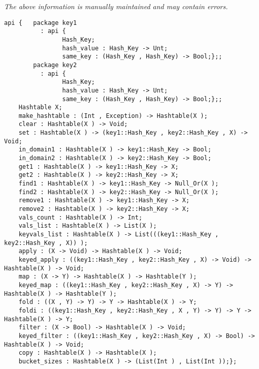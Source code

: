 \label{api:Typelocked\_Double\_Keyed\_Hashtable}

{\tiny \it The above information is manually maintained and may contain errors.}
\begin{verbatim}
api {   package key1
          : api {
                Hash_Key;
                hash_value : Hash_Key -> Unt;
                same_key : (Hash_Key , Hash_Key) -> Bool;};;
        package key2
          : api {
                Hash_Key;
                hash_value : Hash_Key -> Unt;
                same_key : (Hash_Key , Hash_Key) -> Bool;};;
    Hashtable X;
    make_hashtable : (Int , Exception) -> Hashtable(X );
    clear : Hashtable(X ) -> Void;
    set : Hashtable(X ) -> (key1::Hash_Key , key2::Hash_Key , X) -> Void;
    in_domain1 : Hashtable(X ) -> key1::Hash_Key -> Bool;
    in_domain2 : Hashtable(X ) -> key2::Hash_Key -> Bool;
    get1 : Hashtable(X ) -> key1::Hash_Key -> X;
    get2 : Hashtable(X ) -> key2::Hash_Key -> X;
    find1 : Hashtable(X ) -> key1::Hash_Key -> Null_Or(X );
    find2 : Hashtable(X ) -> key2::Hash_Key -> Null_Or(X );
    remove1 : Hashtable(X ) -> key1::Hash_Key -> X;
    remove2 : Hashtable(X ) -> key2::Hash_Key -> X;
    vals_count : Hashtable(X ) -> Int;
    vals_list : Hashtable(X ) -> List(X );
    keyvals_list : Hashtable(X ) -> List(((key1::Hash_Key , key2::Hash_Key , X)) );
    apply : (X -> Void) -> Hashtable(X ) -> Void;
    keyed_apply : ((key1::Hash_Key , key2::Hash_Key , X) -> Void) -> Hashtable(X ) -> Void;
    map : (X -> Y) -> Hashtable(X ) -> Hashtable(Y );
    keyed_map : ((key1::Hash_Key , key2::Hash_Key , X) -> Y) -> Hashtable(X ) -> Hashtable(Y );
    fold : ((X , Y) -> Y) -> Y -> Hashtable(X ) -> Y;
    foldi : ((key1::Hash_Key , key2::Hash_Key , X , Y) -> Y) -> Y -> Hashtable(X ) -> Y;
    filter : (X -> Bool) -> Hashtable(X ) -> Void;
    keyed_filter : ((key1::Hash_Key , key2::Hash_Key , X) -> Bool) -> Hashtable(X ) -> Void;
    copy : Hashtable(X ) -> Hashtable(X );
    bucket_sizes : Hashtable(X ) -> (List(Int ) , List(Int ));};
\end{verbatim}
